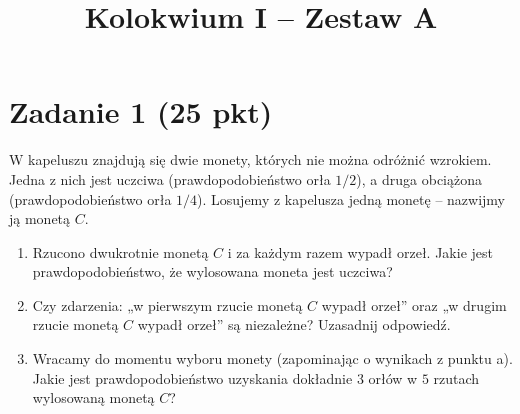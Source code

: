 \documentclass[polish, 10pt]{extarticle}
\theoremstyle{definition}
\begin{document}
\title{Kolokwium I -- Zestaw A}
\author{}
\date{}

\maketitle
\vspace{-2cm}

\section*{Zadanie 1 (25 pkt)}

W kapeluszu znajdują się dwie monety, których nie można odróżnić wzrokiem. Jedna z nich jest uczciwa (prawdopodobieństwo orła $1/2$), a druga obciążona (prawdopodobieństwo orła $1/4$). Losujemy z kapelusza jedną monetę – nazwijmy ją monetą $C$.
\begin{enumerate}
\item Rzucono dwukrotnie monetą $C$ i za każdym razem wypadł orzeł. Jakie jest prawdopodobieństwo, że wylosowana moneta jest uczciwa?
\item Czy zdarzenia: „w pierwszym rzucie monetą $C$ wypadł orzeł” oraz „w drugim rzucie monetą $C$ wypadł orzeł” są niezależne? Uzasadnij odpowiedź.
\item Wracamy do momentu wyboru monety (zapominając o wynikach z punktu a). Jakie jest prawdopodobieństwo uzyskania dokładnie $3$ orłów w $5$ rzutach wylosowaną monetą $C$?
\end{enumerate}
\end{document}
